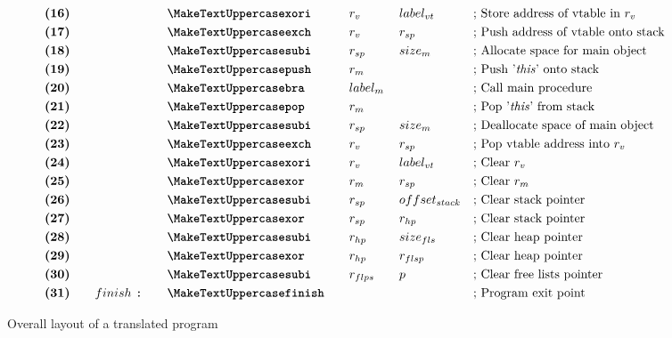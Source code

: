 \begin{figure}[ht]
{\begin{minipage}{\linewidth}
\begin{alignat*}{6}
                &\textbf{(16)}\quad&& &&\inst{xori}\quad &&r_v\quad &&label_{vt}\qquad &&\text{; Store address of vtable in     $r_v$}\\
                &\textbf{(17)}\quad&& &&\inst{exch}\quad &&r_v\quad &&r_{sp}\qquad &&\text{; Push address of vtable onto    stack}\\
                &\textbf{(18)}\quad&& &&\inst{subi}\quad &&r_{sp}\quad &&size_m\qquad &&\text{; Allocate space for main     object}\\
                &\textbf{(19)}\quad&& &&\inst{push}\quad &&r_m\quad && &&\text{; Push '\textit{this}' onto stack}\\
                &\textbf{(20)}\quad&& &&\inst{bra}\quad &&label_m \span\omit\span \qquad&&\text{; Call main procedure}\\
                &\textbf{(21)}\quad&& &&\inst{pop}\quad &&r_m\quad && &&\text{; Pop '\textit{this}' from stack}\\
                &\textbf{(22)}\quad&& &&\inst{subi}\quad &&r_{sp}\quad &&size_m\qquad &&\text{; Deallocate space of main    object}\\
                &\textbf{(23)}\quad&& &&\inst{exch}\quad &&r_v\quad &&r_{sp}\qquad &&\text{; Pop vtable address into $r_v$}\\
                &\textbf{(24)}\quad&& &&\inst{xori}\quad &&r_v\quad &&label_{vt}\qquad &&\text{; Clear $r_v$}\\
                &\textbf{(25)}\quad&& &&\inst{xor}\quad &&r_m\quad &&r_{sp}\qquad &&\text{; Clear $r_m$}\\
                &\textbf{(26)}\quad&& &&\inst{subi}\quad &&r_{sp}\quad &&offset_{stack} &&\text{; Clear stack pointer}\\
                &\textbf{(27)}\quad&& &&\inst{xor}\quad &&r_{sp}\quad &&r_{hp} &&\text{; Clear stack pointer}\\
                &\textbf{(28)}\quad&& &&\inst{subi}\quad &&r_{hp}\quad &&size_{fls} &&\text{; Clear heap pointer}\\
                &\textbf{(29)}\quad&& &&\inst{xor}\quad &&r_{hp}\quad &&r_{flsp} &&\text{; Clear heap pointer}\\
                &\textbf{(30)}\quad&& &&\inst{subi}\quad &&r_{flps}\quad &&p &&\text{; Clear free lists pointer}\\
                &\textbf{(31)}\quad&&finish\ \texttt{:}\quad&&\inst{finish}\quad && && &&\text{; Program exit point}
            \end{alignat*}
        \end{minipage}
    }
    \caption{Overall layout of a translated \rooplpp program}
    \label{fig:pisa-program-layout}
\end{figure}

